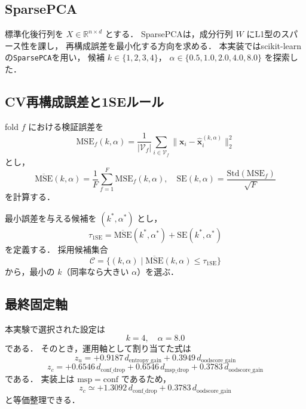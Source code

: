 \documentclass[11pt,a4paper]{article}
\begin{document}
\subsection*{SparsePCA}
標準化後行列を $X\in\mathbb{R}^{n\times d}$ とする．
SparsePCAは，成分行列 $W$ にL1型のスパース性を課し，
再構成誤差を最小化する方向を求める．
本実装ではscikit-learnの\texttt{SparsePCA}を用い，
候補 $k\in\{1,2,3,4\}$，
$\alpha\in\{0.5,1.0,2.0,4.0,8.0\}$ を探索した．

\subsection*{CV再構成誤差と1SEルール}
fold $f$ における検証誤差を
\begin{equation}
\mathrm{MSE}_f(k,\alpha)=\frac{1}{|\mathcal{V}_f|}\sum_{i\in\mathcal{V}_f}\lVert \mathbf{x}_i-\hat{\mathbf{x}}_i^{(k,\alpha)}\rVert_2^2
\end{equation}
とし，
\begin{equation}
\overline{\mathrm{MSE}}(k,\alpha)=\frac{1}{F}\sum_{f=1}^{F}\mathrm{MSE}_f(k,\alpha),
\quad
\mathrm{SE}(k,\alpha)=\frac{\mathrm{Std}(\mathrm{MSE}_f)}{\sqrt{F}}
\end{equation}
を計算する．

最小誤差を与える候補を $(k^{\ast},\alpha^{\ast})$ とし，
\begin{equation}
\tau_{\mathrm{1SE}}=\overline{\mathrm{MSE}}(k^{\ast},\alpha^{\ast})+\mathrm{SE}(k^{\ast},\alpha^{\ast})
\end{equation}
を定義する．
採用候補集合
\begin{equation}
\mathcal{C}=\{(k,\alpha)\mid \overline{\mathrm{MSE}}(k,\alpha)\le\tau_{\mathrm{1SE}}\}
\end{equation}
から，最小の $k$（同率なら大きい $\alpha$）を選ぶ．

\subsection*{最終固定軸}
本実験で選択された設定は
\begin{equation}
k=4,\quad \alpha=8.0
\end{equation}
である．
そのとき，運用軸として割り当てた式は
\begin{equation}
z_u = +0.9187\,d_{\mathrm{entropy\_gain}} +0.3949\,d_{\mathrm{oodscore\_gain}}
\end{equation}
\begin{equation}
z_c = +0.6546\,d_{\mathrm{conf\_drop}} +0.6546\,d_{\mathrm{msp\_drop}} +0.3783\,d_{\mathrm{oodscore\_gain}}
\end{equation}
である．
実装上は $\mathrm{msp}=\mathrm{conf}$ であるため，
\begin{equation}
z_c \simeq +1.3092\,d_{\mathrm{conf\_drop}} +0.3783\,d_{\mathrm{oodscore\_gain}}
\end{equation}
と等価整理できる．
\end{document}
